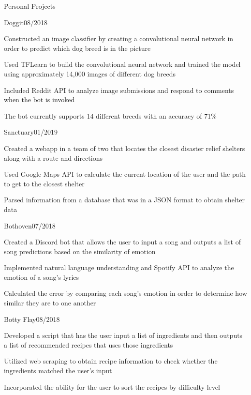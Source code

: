 \documentclass{resume}
\begin{document}
\begin{rSection}{Personal Projects}

\begin{rSubsection}{Doggit}{08/2018}{}{}
\item Constructed an image classifier by creating a convolutional neural network in order to predict which dog breed is in the picture
\item Used TFLearn to build the convolutional neural network and trained the model using approximately 14,000 images of different dog breeds
\item Included Reddit API to analyze image submissions and respond to comments when the bot is invoked
\item The bot currently supports 14 different breeds with an accuracy of 71\%
\end{rSubsection}

\begin{rSubsection}{Sanctuary}{01/2019}{}{}
\item Created a webapp in a team of two that locates the closest disaster relief shelters along with a route and directions
\item Used Google Maps API to calculate the current location of the user and the path to get to the closest shelter
\item Parsed information from a database that was in a JSON format to obtain shelter data
\end{rSubsection}

\begin{rSubsection}{Bothoven}{07/2018}{}{}
\item Created a Discord bot that allows the user to input a song and outputs a list of song predictions based on the similarity of emotion
\item Implemented natural language understanding and Spotify API to analyze the emotion of a song's lyrics
\item Calculated the error by comparing each song's emotion in order to determine how similar they are to one another
\end{rSubsection}

\begin{rSubsection}{Botty Flay}{08/2018}{}{}
\item Developed a script that has the user input a list of ingredients and then outputs a list of recommended recipes that uses those ingredients
\item Utilized web scraping to obtain recipe information to check whether the ingredients matched the user's input
\item Incorporated the ability for the user to sort the recipes by difficulty level
\end{rSubsection}

\end{rSection}
\end{document}
